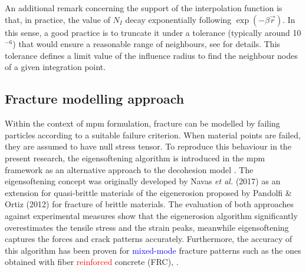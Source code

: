 \documentclass[preprint,12pt,a4paper]{elsarticle}
\begin{document}
An additional remark concerning the support of the interpolation
function is that, in practice, the value of $N_I$ decay exponentially following $\exp(-\beta \vec{r}
)$. In this sense,
a good practice is to truncate it under a tolerance  (typically around 10$^{-6}$) that would ensure a reasonable
range of neighbours, see \cite{Arroyo2006} for details. This tolerance
defines a limit value of the influence radius to find the neighbour
nodes of a given integration point.

\subsection{Fracture modelling approach}
\label{sec:2.3}
Within the context of \acrshort{mpm} formulation, fracture can be
modelled by failing particles according to a suitable failure
criterion. When material points are failed, they are assumed to have
null stress tensor. To reproduce this behaviour in the present
research, the eigensoftening algorithm is introduced in the 
\acrshort{mpm} framework as an alternative approach to the decohesion
model \cite{Schreyer_2002}. The eigensoftening concept
was originally developed by Navas {\it et al.}
(2017)\cite{Navas_2017_ES} as an extension for quasi-brittle materials
of the eigenerosion proposed by Pandolfi \& Ortiz
(2012)\cite{Pandolfi_2012} for fracture of brittle materials. The
  evaluation of both approaches \cite{Navas_2017_ES} against
  experimental measures show that the eigenerosion algorithm significantly overestimates the tensile stress and the strain peaks, meanwhile eigensoftening captures the forces and crack
patterns accurately. Furthermore, the accuracy of this algorithm has been proven for \textcolor{blue}{mixed-mode} fracture patterns such as the ones obtained with fiber \textcolor{red}{reinforced} concrete (FRC),
\cite{Navas_2018_ES}.\\
\end{document}
